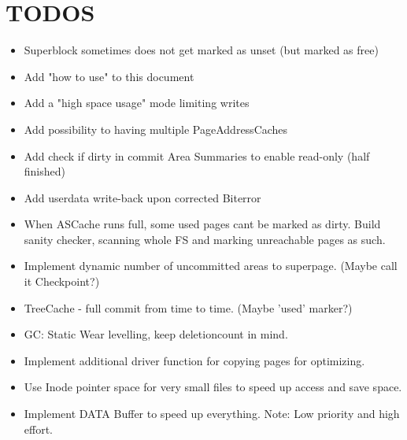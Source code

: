 \section{TODOS}
\begin{itemize}
    \item Superblock sometimes does not get marked as unset (but marked as free)
    \item Add "how to use" to this document
    \item Add a "high space usage" mode limiting writes 
    \item Add possibility to having multiple PageAddressCaches
    \item Add check if dirty in commit Area Summaries to enable read-only (half finished)
    \item Add userdata write-back upon corrected Biterror
	\item When ASCache runs full, some used pages cant be marked as dirty. Build sanity checker, scanning whole FS and marking unreachable pages as such.
	\item Implement dynamic number of uncommitted areas to superpage. (Maybe call it Checkpoint?)
	\item TreeCache - full commit from time to time. (Maybe 'used' marker?)
	\item GC: Static Wear levelling, keep deletioncount in mind.
	\item Implement additional driver function for copying pages for optimizing.
	\item Use Inode pointer space for very small files to speed up access and save space.
	\item Implement DATA Buffer to speed up everything. Note: Low priority and high effort.
\end{itemize}
